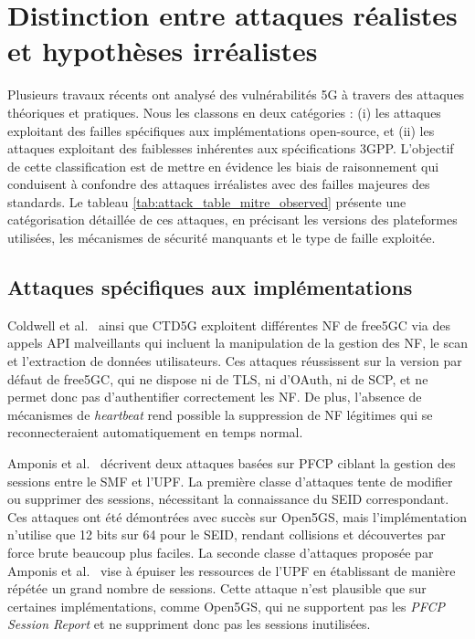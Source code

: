 \documentclass[a4paper,11pt,twoside]{StyleThese}
\begin{document}
\section{Distinction entre attaques réalistes et hypothèses irréalistes}
Plusieurs travaux récents ont analysé des vulnérabilités 5G à travers des attaques théoriques et pratiques. Nous les classons en deux catégories : (i) les attaques exploitant des failles spécifiques aux implémentations open-source, et (ii) les attaques exploitant des faiblesses inhérentes aux spécifications 3GPP. L’objectif de cette classification est de mettre en évidence les biais de raisonnement qui conduisent à confondre des attaques irréalistes avec des failles majeures des standards. Le tableau \ref{tab:attack_table_mitre_observed} présente une catégorisation détaillée de ces attaques, en précisant les versions des plateformes utilisées, les mécanismes de sécurité manquants et le type de faille exploitée.

\subsection{Attaques spécifiques aux implémentations}

Coldwell et al.~\cite{5gad} ainsi que CTD5G \cite{CTD5G} exploitent différentes NF de free5GC via des appels API malveillants qui incluent la manipulation de la gestion des NF, le scan et l'extraction de données utilisateurs. Ces attaques réussissent sur la version par défaut de free5GC, qui ne dispose ni de TLS, ni d’OAuth, ni de SCP, et ne permet donc pas d’authentifier correctement les NF. De plus, l’absence de mécanismes de \textit{heartbeat} rend possible la suppression de NF légitimes qui se reconnecteraient automatiquement en temps normal.

Amponis et al.~\cite{pfcp1} décrivent deux attaques basées sur PFCP ciblant la gestion des sessions entre le SMF et l'UPF. La première classe d’attaques tente de modifier ou supprimer des sessions, nécessitant la connaissance du SEID correspondant. Ces attaques ont été démontrées avec succès sur Open5GS, mais l'implémentation n’utilise que 12 bits sur 64 pour le SEID, rendant collisions et découvertes par force brute beaucoup plus faciles.
La seconde classe d’attaques proposée par Amponis et al.~\cite{pfcp1} vise à épuiser les ressources de l'UPF en établissant de manière répétée un grand nombre de sessions. Cette attaque n’est plausible que sur certaines implémentations, comme Open5GS, qui ne supportent pas les \textit{PFCP Session Report} et ne suppriment donc pas les sessions inutilisées.
\end{document}
